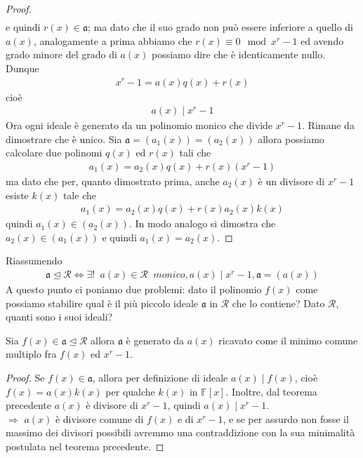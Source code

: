 \begin{proof}
\begin{align*}
   \end{align*}
   e quindi $r(x) \in \mathfrak{a}$; ma dato che il suo grado non può essere inferiore a quello di $a(x)$, analogamente a prima abbiamo che $r(x)\equiv 0 \mod{x^r - 1}$ ed avendo grado minore del grado di $a(x)$ possiamo dire che è identicamente nullo. Dunque
   \begin{align*}
      x^r - 1 = a(x)q(x) + r(x)
   \end{align*}
   cioè
   \begin{align*}
      a(x) \mid x^r - 1
   \end{align*}
   Ora ogni ideale è generato da un polinomio monico che divide $x^r-1$. Rimane da dimostrare che è unico.
   Sia $\mathfrak{a} = (a_{1}(x)) = (a_{2}(x))$ allora possiamo calcolare due polinomi $q(x)$ ed $r(x)$ tali che
   \begin{align*}
      a_{1}(x) = a_{2}(x)q(x) + r(x)(x^r - 1)
   \end{align*}
   ma dato che per, quanto dimostrato prima, anche $a_{2}(x)$ è un divisore di $x^r-1$ esiste $k(x)$ tale che
   \begin{align*}
      a_{1}(x) = a_{2}(x)q(x) + r(x)a_{2}(x)k(x)
   \end{align*}
   quindi $a_{1}(x) \in (a_{2}(x))$. In modo analogo si dimostra che $a_{2}(x) \in (a_{1}(x))$ e quindi
   $a_{1}(x) = a_{2}(x) $.
\end{proof}
\noindent
Riassumendo
\begin{align*}
   \mathfrak{a} \unlhd \mathcal{R} \Leftrightarrow
      \exists ! \phantom{a}  a(x) \in \mathcal{R} \phantom{a} monico, a(x) \mid x^r - 1 , \mathfrak{a} = (a(x))
\end{align*}
A questo punto ci poniamo due problemi: dato il polinomio $f(x)$ come possiamo stabilire qual è il più piccolo ideale $\mathfrak{a}$ in $\mathcal{R}$ che lo contiene? Dato $\mathcal{R}$, quanti sono i suoi ideali?
\begin{corollario}
   Sia $f(x) \in \mathfrak{a} \unlhd \mathcal{R}$ allora $\mathfrak{a}$ è generato da $a(x)$ ricavato come il minimo comune multiplo fra $f(x)$ ed $x^r - 1$.
\end{corollario}
\begin{proof}
   Se $f(x) \in \mathfrak{a}$, allora per definizione di ideale $a(x) \mid f(x)$, cioè $f(x) = a(x)k(x)$ per qualche $k(x)$ in $\mathbb{F}[x]$. Inoltre, dal teorema precedente $a(x)$ è divisore di $x^r-1$, quindi $a(x) \mid x^r - 1$.\\ $\Longrightarrow$ $a(x)$ è divisore comune di $f(x)$ e di $x^r-1$, e se per assurdo non fosse il massimo dei divisori possibili avremmo una contraddizione con la sua minimalità postulata nel teorema precedente.
\end{proof}
